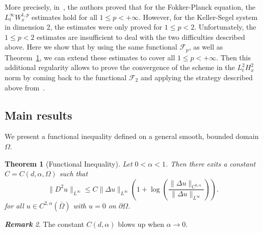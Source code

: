 \documentclass[a4paper,twosided, 11pt]{article}
\renewcommand{\color}[2][]{}
\newcommand {\p}   {\partial}
\theoremstyle{plain}
\newtheorem{thm}{Theorem}[section]
\theoremstyle{remark}
\newtheorem{remark}[thm]{\bf Remark}
\numberwithin{equation}{section}
\begin{document}
More precisely, in~\cite{dimarino}, the authors proved that for the  Fokker-Planck equation, the $L^{\infty}_t W^{1,p}_{x}$ estimates hold for all $1 \leq p < +\infty$. However, for the Keller-Segel system in dimension 2, the estimates were only proved for $1 \leq p < 2$. Unfortunately, the $1\le p<2$ estimates are insufficient to deal with the two difficulties described above. Here we show that by using the same functional $\mathcal{F}_p$, as well as Theorem~\ref{thm:functional_inequality}, we can extend these estimates to cover all $1 \leq p < +\infty$. Then this additional regularity allows to prove the convergence of the scheme in the $L^2_t H^2_x$ norm by coming back to the functional $\mathcal{F}_2$ and applying the strategy described above from~\cite{toshpulatov}.

\subsection{Main results}

We present a functional inequality defined on a general smooth, bounded domain $\Omega$.

\begin{thm}[Functional Inequality]\label{thm:functional_inequality} Let $0<\alpha<1$. Then there exits a constant $C= C(d,\alpha, {\color{blue}\Omega})$  such that
\begin{equation}
    \|D^{2}u\|_{L^{\infty}} \leq C \|\Delta u \|_{L^{\infty}}\left(1+ \log\left(\frac{\|\Delta u\|_{C^{0,\alpha}}}{\|\Delta u \|_{L^{\infty}}}\right)\right).
\end{equation}
for all $u\in C^{2,\alpha}(\bar{\Omega})$ with $u=0$ on $\p\Omega$.
\end{thm}

\begin{remark}
The constant $C(d,\alpha)$ blows up when $\alpha\to 0$.
\end{remark}
\end{document}
